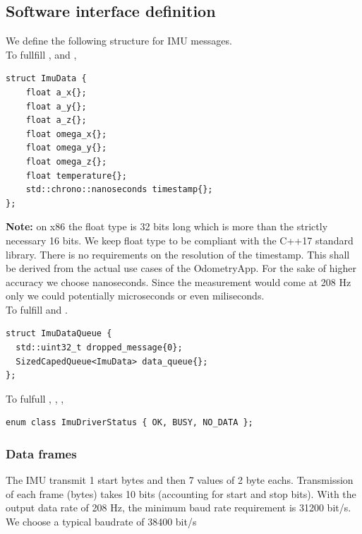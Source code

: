 \subsection{Software interface definition}
We define the following structure for IMU messages.\\
To fullfill ,  and ,
\begin{lstlisting}[style=cppstyle]
struct ImuData {
    float a_x{};
    float a_y{};
    float a_z{};
    float omega_x{};
    float omega_y{};
    float omega_z{};
    float temperature{};
    std::chrono::nanoseconds timestamp{};
};
\end{lstlisting}
\textbf{Note:} on x86 the float type is 32 bits long which is more than the strictly necessary 16 bits. We keep float type to be compliant with the C++17 standard library.
There is no requirements on the resolution of the timestamp. This shall be derived from the actual use cases of the OdometryApp.
For the sake of higher accuracy we choose nanoseconds.
Since the measurement would come at 208 Hz only we could potentially microseconds or even miliseconds.\\

To fulfill  and .
\begin{lstlisting}[style=cppstyle]
struct ImuDataQueue {
  std::uint32_t dropped_message{0};
  SizedCapedQueue<ImuData> data_queue{};
};
\end{lstlisting}

To fulfull , , ,
\begin{lstlisting}[style=cppstyle]
enum class ImuDriverStatus { OK, BUSY, NO_DATA };
\end{lstlisting}


\subsubsection{Data frames}
The IMU transmit 1 start bytes and then 7 values of 2 byte eachs.
Transmission of each frame (bytes) takes 10 bits (accounting for start and stop bits).
With the output data rate of 208 Hz, the minimum baud rate requirement is 31200 bit/s.
We choose a typical baudrate of 38400 bit/s

